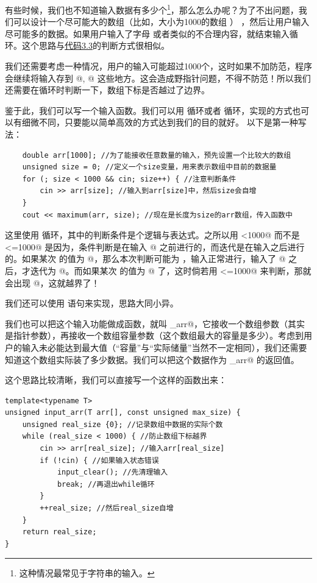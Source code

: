 有些时候，我们也不知道输入数据有多少个\footnote{这种情况最常见于字符串的输入。}，那么怎么办呢？为了不出问题，我们可以设计一个尽可能大的数组（比如，大小为1000的数组 \lstinline@arr@） ，然后让用户输入尽可能多的数据。如果用户输入了字母 \lstinline@q@ 或者类似的不合理内容，就结束输入循环。这个思路与\hyperref[lst:OddOrEvenWithWhileLoop]{代码3.3}的判断方式很相似。\par
我们还需要考虑一种情况，用户的输入可能超过1000个，这时如果不加防范，程序会继续将输入存到 \lstinline@arr[1000]@, \lstinline@arr[1001]@ 这些地方。这会造成野指针问题，不得不防范！所以我们还需要在循环时判断一下，数组下标是否越过了边界。\par
鉴于此，我们可以写一个输入函数。我们可以用 \lstinline@for@ 循环或者 \lstinline@while@ 循环，实现的方式也可以有细微不同，只要能以简单高效的方式达到我们的目的就好。
以下是第一种写法：
\begin{lstlisting}
    double arr[1000]; //为了能接收任意数量的输入，预先设置一个比较大的数组
    unsigned size = 0; //定义一个size变量，用来表示数组中目前的数据量
    for (; size < 1000 && cin; size++) { //注意判断条件
        cin >> arr[size]; //输入到arr[size]中，然后size会自增
    }
    cout << maximum(arr, size); //现在是长度为size的arr数组，传入函数中
\end{lstlisting}
这里使用 \lstinline@for@ 循环，其中的判断条件是个逻辑与表达式。之所以用 \lstinline@size<1000@ 而不是 \lstinline@size<=1000@ 是因为，条件判断是在输入 \lstinline@arr[size]@ 之前进行的，而迭代是在输入之后进行的。如果某次 \lstinline@size@ 的值为 @，那么本次判断可能为 \lstinline@true@，输入正常进行，输入了 \lstinline@arr[999]@ 之后，\lstinline@size@ 才迭代为 @。而如果某次 \lstinline@size@ 的值为 @ 了，这时倘若用 \lstinline@size<=1000@ 来判断，那就会出现 \lstinline@arr[1000]@，这就越界了！\par
我们还可以使用 \lstinline@while@ 语句来实现，思路大同小异。\par
我们也可以把这个输入功能做成函数，就叫 \lstinline@input_arr@，它接收一个数组参数（其实是指针参数），再接收一个数组容量参数（这个数组最大的容量是多少）。考虑到用户的输入未必能达到最大值（``容量''与``实际储量''当然不一定相同），我们还需要知道这个数组实际装了多少数据。我们可以把这个数据作为 \lstinline@input_arr@ 的返回值。\par
这个思路比较清晰，我们可以直接写一个这样的函数出来：
\begin{lstlisting}
template<typename T>
unsigned input_arr(T arr[], const unsigned max_size) {
    unsigned real_size {0}; //记录数组中数据的实际个数
    while (real_size < 1000) { //防止数组下标越界
        cin >> arr[real_size]; //输入arr[real_size]
        if (!cin) { //如果输入状态错误
            input_clear(); //先清理输入
            break; //再退出while循环
        }
        ++real_size; //然后real_size自增
    }
    return real_size;
}
\end{lstlisting}
